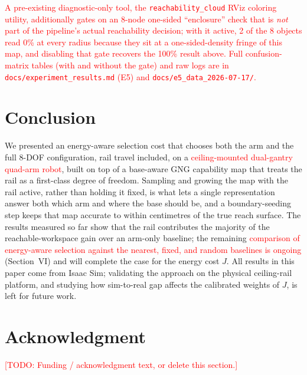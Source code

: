 \documentclass[conference]{IEEEtran}
\newcommand{\TODO}[1]{\textcolor{red}{[TODO: #1]}}
\begin{document}
\textcolor{red}{A pre-existing diagnostic-only tool, the \texttt{reachability\_cloud}
RViz coloring utility, additionally gates on an 8-node one-sided ``enclosure''
check that is \emph{not} part of the pipeline's actual reachability decision; with
it active, 2 of the 8 objects read 0\% at every radius because they sit at a
one-sided-density fringe of this map, and disabling that gate recovers the 100\%
result above. Full confusion-matrix tables (with and without the gate) and raw
logs are in \texttt{docs/experiment\_results.md} (E5) and
\texttt{docs/e5\_data\_2026-07-17/}.}

\section{Conclusion}

We presented an energy-aware selection cost that chooses both the arm and the full
8-DOF configuration, rail travel included, on a \textcolor{red}{ceiling-mounted
dual-gantry quad-arm robot}, built
on top of a base-aware GNG capability map that treats the rail as a first-class
degree of freedom. Sampling and growing the map with the rail active, rather than
holding it fixed, is what lets a single representation answer both which arm and
where the base should be, and a boundary-seeding step keeps that map accurate to
within centimetres of the true reach surface. The results measured so far show
that the rail contributes the majority of the reachable-workspace gain over an
arm-only baseline; the remaining \textcolor{red}{comparison of energy-aware selection
against the nearest, fixed, and random baselines is ongoing} (Section~VI) and will
complete the case for the energy cost $J$. All results in this paper come from Isaac Sim; validating the
approach on the physical ceiling-rail platform, and studying how sim-to-real gap
affects the calibrated weights of $J$, is left for future work.

\section*{Acknowledgment}
\TODO{Funding / acknowledgment text, or delete this section.}
\end{document}
